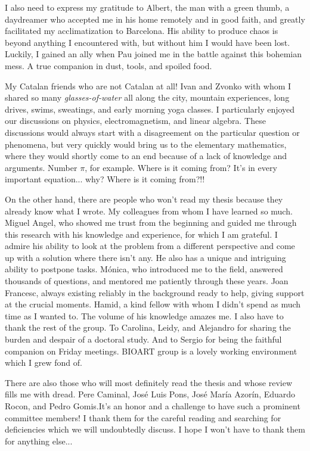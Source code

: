 \begin{acknowledgements}
I also need to express my gratitude to Albert, the man with a green thumb, a daydreamer who accepted me in his home remotely and in good faith, and greatly facilitated my acclimatization to Barcelona. His ability to produce chaos is beyond anything I encountered with, but without him I would have been lost. Luckily, I gained an ally when Pau joined me in the battle against this bohemian mess. A true companion in dust, tools, and spoiled food.

My Catalan friends who are not Catalan at all! Ivan and Zvonko with whom I shared so many \emph{glasses-of-water} all along the city, mountain experiences, long drives, swims, sweatings, and early morning yoga classes. I particularly enjoyed our discussions on physics, electromagnetism, and linear algebra. These discussions would always start with a disagreement on the particular question or phenomena, but very quickly would bring us to the elementary mathematics, where they would shortly come to an end because of a lack of knowledge and arguments. Number $\pi$, for example. Where is it coming from? It's in every important equation... why? Where is it coming from?!!

On the other hand, there are people who won't read my thesis because they already know what I wrote. My colleagues from whom I have learned so much. Miguel Angel, who showed me trust from the beginning and guided me through this research with his knowledge and experience, for which I am grateful. I admire his ability to look at the problem from a different perspective and come up with a solution where there isn't any. He also has a unique and intriguing ability to postpone tasks. Mónica, who introduced me to the field, answered thousands of questions, and mentored me patiently through these years. Joan Francesc, always existing reliably in the background ready to help, giving support at the crucial moments. Hamid, a kind fellow with whom I didn't spend as much time as I wanted to. The volume of his knowledge amazes me. I also have to thank the rest of the group. To Carolina, Leidy, and Alejandro for sharing the burden and despair of a doctoral study. And to Sergio for being the faithful companion on Friday meetings. BIOART group is a lovely working environment which I grew fond of.

There are also those who will most definitely read the thesis and whose review fills me with dread. Pere Caminal, José Luis Pons, José María Azorín, Eduardo Rocon, and Pedro Gomis.It's an honor and a challenge to have such a prominent committee members! I thank them for the careful reading and searching for deficiencies which we will undoubtedly discuss. I hope I won't have to thank them for anything else... 


\end{acknowledgements}
